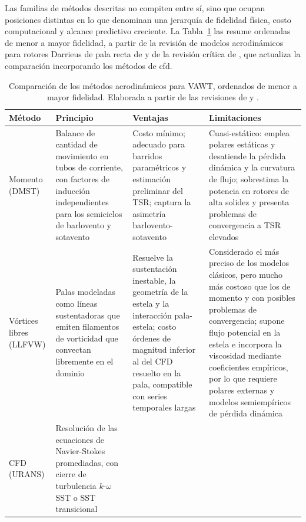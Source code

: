 Las familias de métodos descritas no compiten entre sí, sino que ocupan posiciones distintas en lo que \textcite{Essahraoui2026} denominan una jerarquía de fidelidad física, costo computacional y alcance predictivo creciente. La Tabla~\ref{tab:comparacion_metodos} las resume ordenadas de menor a mayor fidelidad, a partir de la revisión de modelos aerodinámicos para rotores Darrieus de pala recta de \textcite{Islam2008} y de la revisión crítica de \textcite{Essahraoui2026}, que actualiza la comparación incorporando los métodos de \gls{cfd}.

\begin{table}[H]
    \centering
    \caption{Comparación de los métodos aerodinámicos para VAWT, ordenados de menor a mayor fidelidad. Elaborada a partir de las revisiones de \textcite{Islam2008} y \textcite{Essahraoui2026}.}
    \label{tab:comparacion_metodos}
    \renewcommand{\arraystretch}{1.2}
    \footnotesize
    \begin{tabular}{p{2.2cm} p{3.3cm} p{3.4cm} p{4.4cm}}
        \hline
        \textbf{Método} & \textbf{Principio} & \textbf{Ventajas} & \textbf{Limitaciones} \\
        \hline
        Momento (DMST) &
        Balance de cantidad de movimiento en tubos de corriente, con factores de inducción independientes para los semiciclos de barlovento y sotavento &
        Costo mínimo; adecuado para barridos paramétricos y estimación preliminar del TSR; captura la asimetría barlovento-sotavento &
        Cuasi-estático: emplea polares estáticas y desatiende la pérdida dinámica y la curvatura de flujo; sobrestima la potencia en rotores de alta solidez y presenta problemas de convergencia a TSR elevados~\parencite{Islam2008,Essahraoui2026} \\
        Vórtices libres (LLFVW) &
        Palas modeladas como líneas sustentadoras que emiten filamentos de vorticidad que convectan libremente en el dominio &
        Resuelve la sustentación inestable, la geometría de la estela y la interacción pala-estela; costo órdenes de magnitud inferior al del CFD resuelto en la pala, compatible con series temporales largas &
        Considerado el más preciso de los modelos clásicos, pero mucho más costoso que los de momento y con posibles problemas de convergencia; supone flujo potencial en la estela e incorpora la viscosidad mediante coeficientes empíricos, por lo que requiere polares externas y modelos semiempíricos de pérdida dinámica~\parencite{Islam2008,Essahraoui2026} \\
        CFD (URANS) &
        Resolución de las ecuaciones de Navier-Stokes promediadas, con cierre de turbulencia $k$-$\omega$ SST o SST transicional &

\end{tabular}
\end{table}
